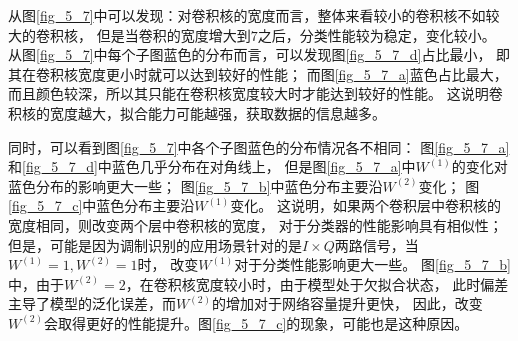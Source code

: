 从图\ref{fig_5_7}中可以发现：对卷积核的宽度而言，整体来看较小的卷积核不如较大的卷积核，
但是当卷积的宽度增大到$7$之后，分类性能较为稳定，变化较小。
从图\ref{fig_5_7}中每个子图蓝色的分布而言，可以发现图\ref{fig_5_7_d}占比最小，
即其在卷积核宽度更小时就可以达到较好的性能；
而图\ref{fig_5_7_a}蓝色占比最大，而且颜色较深，所以其只能在卷积核宽度较大时才能达到较好的性能。
这说明卷积核的宽度越大，拟合能力可能越强，获取数据的信息越多。\par

同时，可以看到图\ref{fig_5_7}中各个子图蓝色的分布情况各不相同：
图\ref{fig_5_7_a}和\ref{fig_5_7_d}中蓝色几乎分布在对角线上，
但是图\ref{fig_5_7_a}中$W^{(1)}$的变化对蓝色分布的影响更大一些；
图\ref{fig_5_7_b}中蓝色分布主要沿$W^{(2)}$变化；
图\ref{fig_5_7_c}中蓝色分布主要沿$W^{(1)}$变化。
这说明，如果两个卷积层中卷积核的宽度相同，则改变两个层中卷积核的宽度，
对于分类器的性能影响具有相似性；
但是，可能是因为调制识别的应用场景针对的是$I \times Q$两路信号，当$W^{(1)}=1, W^{(2)}=1$时，
改变$W^{(1)}$对于分类性能影响更大一些。
图\ref{fig_5_7_b}中，由于$W^{(2)}=2$，在卷积核宽度较小时，由于模型处于欠拟合状态，
此时偏差主导了模型的泛化误差，而$W^{(2)}$的增加对于网络容量提升更快，
因此，改变$W^{(2)}$会取得更好的性能提升。图\ref{fig_5_7_c}的现象，可能也是这种原因。\par
